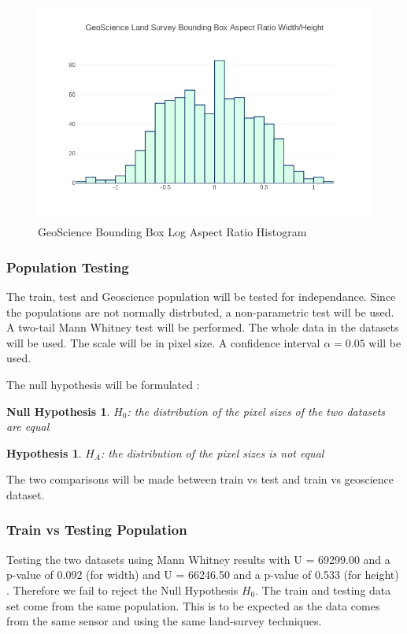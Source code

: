 \documentclass{IEEEtran}
\newtheorem{hypothesis}{Hypothesis}
\newtheorem{nullhypothesis}{Null Hypothesis}
\begin{document}
\begin{figure}[ht]
\centering
\label{geodroneaspect}
\includegraphics[scale=0.4]{images/geoscience-aspect.png}
\caption{GeoScience Bounding Box Log Aspect Ratio Histogram}
\end{figure}

\subsubsection{Population Testing}

The train, test and Geoscience population will be tested for independance. Since the populations are not normally distrbuted, a non-parametric test will be used. A two-tail Mann Whitney test will be performed. The whole data in the datasets will be used. The scale will be in pixel size. A confidence interval $\alpha = 0.05$ will be used.

The null hypothesis will be formulated :
\begin{nullhypothesis}
$H_0$: the distribution of the pixel sizes of the two datasets are equal
\end{nullhypothesis}
\begin{hypothesis}
$H_{A}$: the distribution of the pixel sizes is not equal
\end{hypothesis}

The two comparisons will be made between train vs test and train vs geoscience dataset.

\subsubsection{Train vs Testing Population}

Testing the two datasets using Mann Whitney results with U = 69299.00 and a p-value of 0.092 (for width) and U = 66246.50 and a p-value of 0.533 (for height) . Therefore we fail to reject the Null Hypothesis $H_0$. The train and testing data set come from the same population. This is to be expected as the data comes from the same sensor and using the same land-survey techniques.
\end{document}
